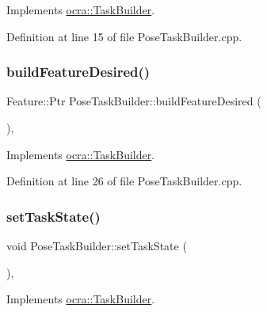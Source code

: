 Implements \hyperlink{classocra_1_1TaskBuilder_a58c0dc416a9607a344a080248ee26ac2}{ocra\+::\+Task\+Builder}.



Definition at line 15 of file Pose\+Task\+Builder.\+cpp.

\hypertarget{classocra_1_1PoseTaskBuilder_a66fa4cdba48138741e19e642684a7006}{}\label{classocra_1_1PoseTaskBuilder_a66fa4cdba48138741e19e642684a7006} 
\subsubsection{\texorpdfstring{build\+Feature\+Desired()}{buildFeatureDesired()}}
{\footnotesize\ttfamily Feature\+::\+Ptr Pose\+Task\+Builder\+::build\+Feature\+Desired (\begin{DoxyParamCaption}{ }\end{DoxyParamCaption})\hspace{0.3cm}{\ttfamily [protected]}, {\ttfamily [virtual]}}



Implements \hyperlink{classocra_1_1TaskBuilder_a7a2c8bcc5d95160d0e48806a2648f1a5}{ocra\+::\+Task\+Builder}.



Definition at line 26 of file Pose\+Task\+Builder.\+cpp.

\hypertarget{classocra_1_1PoseTaskBuilder_a3bc6c07a3ee7656a1f3051500baddbd8}{}\label{classocra_1_1PoseTaskBuilder_a3bc6c07a3ee7656a1f3051500baddbd8} 
\subsubsection{\texorpdfstring{set\+Task\+State()}{setTaskState()}}
{\footnotesize\ttfamily void Pose\+Task\+Builder\+::set\+Task\+State (\begin{DoxyParamCaption}{ }\end{DoxyParamCaption})\hspace{0.3cm}{\ttfamily [protected]}, {\ttfamily [virtual]}}



Implements \hyperlink{classocra_1_1TaskBuilder_a7b44bfa101566ea4400e2d9bfdb9ff32}{ocra\+::\+Task\+Builder}.



